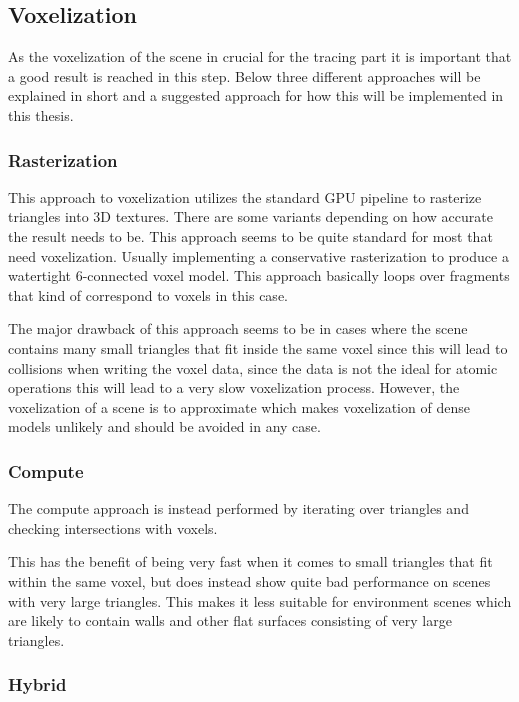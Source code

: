 \documentclass[a4paper, 12pt]{article}
\begin{document}
\subsection{Voxelization}

As the voxelization of the scene in crucial for the tracing part it is important that a good result is reached in this step. Below three different approaches will be explained in short and a suggested approach for how this will be implemented in this thesis. 

\subsubsection{Rasterization}

This approach to voxelization utilizes the standard GPU pipeline to rasterize triangles into 3D textures. There are some variants depending on how accurate the result needs to be. This approach seems to be quite standard for most that need voxelization. Usually implementing a conservative rasterization to produce a watertight 6-connected voxel model. This approach basically loops over fragments that kind of correspond to voxels in this case.

The major drawback of this approach seems to be in cases where the scene contains many small triangles that fit inside the same voxel since this will lead to collisions when writing the voxel data, since the data is not the ideal for atomic operations this will lead to a very slow voxelization process. However, the voxelization of a scene is to approximate which makes voxelization of dense models unlikely and should be avoided in any case. 

\subsubsection{Compute}

The compute approach is instead performed by iterating over triangles and checking intersections with voxels.

This has the benefit of being very fast when it comes to small triangles that fit within the same voxel, but does instead show quite bad performance on scenes with very large triangles. This makes it less suitable for environment scenes which are likely to contain walls and other flat surfaces consisting of very large triangles. 

\subsubsection{Hybrid}
\end{document}
